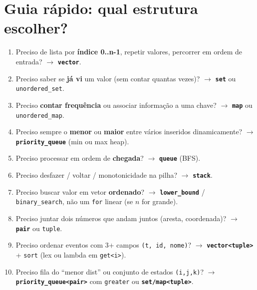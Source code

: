 
\section{Guia rápido: qual estrutura escolher?}

\begin{enumerate}
  \item Preciso de lista por \textbf{índice 0..n-1}, repetir valores, percorrer em ordem de entrada? $\to$ \textbf{\texttt{vector}}.
  \item Preciso saber se \textbf{já vi} um valor (sem contar quantas vezes)? $\to$ \textbf{\texttt{set}} ou \texttt{unordered\_set}.
  \item Preciso \textbf{contar frequência} ou associar informação a uma chave? $\to$ \textbf{\texttt{map}} ou \texttt{unordered\_map}.
  \item Preciso sempre o \textbf{menor} ou \textbf{maior} entre vários inseridos dinamicamente? $\to$ \textbf{\texttt{priority\_queue}} (min ou max heap).
  \item Preciso processar em ordem de \textbf{chegada}? $\to$ \textbf{\texttt{queue}} (BFS).
  \item Preciso desfazer / voltar / monotonicidade na pilha? $\to$ \textbf{\texttt{stack}}.
  \item Preciso buscar valor em vetor \textbf{ordenado}? $\to$ \textbf{\texttt{lower\_bound}} / \texttt{binary\_search}, não um \texttt{for} linear (se $n$ for grande).
  \item Preciso juntar dois números que andam juntos (aresta, coordenada)? $\to$ \textbf{\texttt{pair}} ou \texttt{tuple}.
  \item Preciso ordenar eventos com 3+ campos \texttt{(t, id, nome)}? $\to$ \textbf{\texttt{vector<tuple>}} + \texttt{sort} (lex ou lambda em \texttt{get<i>}).
  \item Preciso fila do ``menor dist'' ou conjunto de estados \texttt{(i,j,k)}? $\to$ \textbf{\texttt{priority\_queue<pair>}} com \texttt{greater} ou \textbf{\texttt{set/map<tuple>}}.
\end{enumerate}

